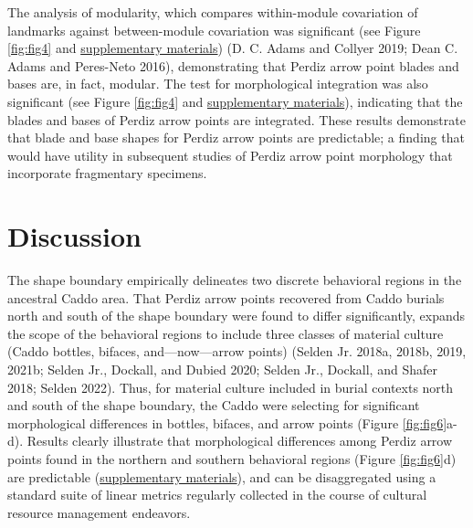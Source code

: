 \documentclass[smallextended]{svjour3}       %
\begin{document}
The analysis of modularity, which compares within-module covariation of
landmarks against between-module covariation was significant (see Figure
\ref{fig:fig4} and
\href{https://seldenlab.github.io/perdiz3/}{supplementary materials})
(D. C. Adams and Collyer 2019; Dean C. Adams and Peres-Neto 2016),
demonstrating that Perdiz arrow point blades and bases are, in fact,
modular. The test for morphological integration was also significant
(see Figure \ref{fig:fig4} and
\href{https://seldenlab.github.io/perdiz3/}{supplementary materials}),
indicating that the blades and bases of Perdiz arrow points are
integrated. These results demonstrate that blade and base shapes for
Perdiz arrow points are predictable; a finding that would have utility
in subsequent studies of Perdiz arrow point morphology that incorporate
fragmentary specimens.

\hypertarget{discussion}{%
\section{Discussion}\label{discussion}}

The shape boundary empirically delineates two discrete behavioral
regions in the ancestral Caddo area. That Perdiz arrow points recovered
from Caddo burials north and south of the shape boundary were found to
differ significantly, expands the scope of the behavioral regions to
include three classes of material culture (Caddo bottles, bifaces,
and---now---arrow points) (Selden Jr. 2018a, 2018b, 2019, 2021b; Selden
Jr., Dockall, and Dubied 2020; Selden Jr., Dockall, and Shafer 2018;
Selden 2022). Thus, for material culture included in burial contexts
north and south of the shape boundary, the Caddo were selecting for
significant morphological differences in bottles, bifaces, and arrow
points (Figure \ref{fig:fig6}a-d). Results clearly illustrate that
morphological differences among Perdiz arrow points found in the
northern and southern behavioral regions (Figure \ref{fig:fig6}d) are
predictable (\href{https://seldenlab.github.io/perdiz3/}{supplementary
materials}), and can be disaggregated using a standard suite of linear
metrics regularly collected in the course of cultural resource
management endeavors.
\end{document}
